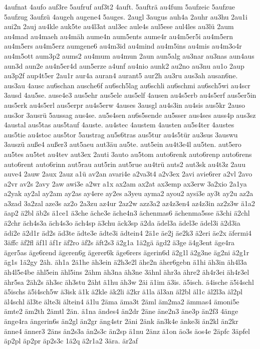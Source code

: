 {4aufnat
4aufo
auf3re
5aufruf
auf3t2
4auft.
5aufträ
au4fum
5aufzeic
5aufzue
5aufzug
3aufzü
4augeh
augene4
5auges.
2augl
3augus
auh4a
2auhr
au3hu
2au1i
aui2n
2auj
au4kle
auk5te
au4l3at
aul3ec
aule4s
aul5ese
aul4les
au3lü
2aum
au4mad
au4maeh
au4mäh
aume4n
aum5ents
aume4r
au4m5er5i
au4m5ern
au4m5ers
au4m5erz
aumgene6
au4m3id
au4mind
au4m5ins
au4mis
au4m3o4r
au4m5ott
aum3p2
aums2
au4mum
au4mun
2aun
aun5alg
au3nar
au3nas
aun4aus
aun3d
aun2e
au4n5er4d
aun5erze
a4unf
au4nio
aunk2
au2no
au3nu
au1o
2aup
au3p2f
aup4t5er
2au1r
aur4a
auran4
aurant5
aur2h
au3ru
aus3ah
ausan6ne.
aus3au
4ausc
au6schan
ausche6f
au6sch5lag
au6schli
au6schmi
au6sch5wi
au4scr
3ausd
4au5se.
ause4e3
aus5ehr
aus5ele
aus5elf
4ausen
au4s5erb
au4s5erf
aus5er5in
aus5erk
au4s5erl
aus5erpr
au4s5erw
4auses
3ausgl
au4s3in
au4sis
aus5kr
2auso
aus3or
3ausrü
5aussag
aus4se.
au5s4sen
au6s5sende
au5sser
aus4ses
auss4p
aus3sz
4austal
aus5tas
aus5tauf
4auste.
au4stec
4austem
4austen
au5s4ter
4austes
aus5tie
au4stoc
aus5tor
5austrag
au5s6tras
aus5tur
au4s5tür
au3sus
3auswu
3auszü
auße4
außer3
aut5aeu
aut3äu
au5te.
aut5ein
au4t3e4l
au5ten.
aut5ero
au5tes
au5tet
au4tev
aut3ex
2auti
3auto
au5tom
auto6renk
auto6renp
auto6rens
auto6rent
auto6rinn
aut5rau
aut5rin
aut5rue
au4trü
auts2
aut3sk
au4t3z
2auu
auve4
2auw
2aux
2auz
a1ü
av2an
avari4e
a2va3t4
a2v3ex
2avi
avie6rer
a2vl
2avo
a2vr
av2s
2avy
2aw
awi3e
a2wr
a1x
ax2am
ax2at
ax3emp
ax3erw
3a2xio
2a1ya
a2yak
ay2al
ay2am
ay2as
ay4ere
ay2es
a3yeu
ayma2
ayou2
aysi3e
ay3t
ay2u
az2a
a3zad
3a2zal
aze3s
az2o
2a3zu
az4ur
2az2w
azz3a2
az4z3en4
az4z3in
az2z3w
ä1a2
äap2
ä2bl
äb2s
ä1ce1
ä3che
äche3e
äche4n3
ächenmas6
ächenma5sse
ä3chi
ä2chl
ä2chr
äch4s3a
äch4s3o
äch4sp
ä3chu
äck3sp
ä2da
ädel3a
ädel3e
ädel3i
ä2d3ia
ädi2e
ä2d1r
äd2s
äd3te
ädte3e
ädte3i
ädtein4
2ä1e
äe2j
äe2k3
ä2eri
äe2x
äfermi4
3äffc
äf2fl
äf1l
äf1r
äf2ro
äf2s
äft2s3
ä2g1a
1ä2gä
ägd2
ä3ge
ä4g3ent
äge4ra
äger5as
äge6rend
ägeren6g
ägerer6k
äge6rers
ägerin6d
ä2g1l
ä2g3ne
äg2ni
ä2g1r
äg1s
1ä2gy
2äh.
äh1a
2ä1he
äh3ein
ä2h3e2l
ähe2n
äher6gebn
ä1hi
äh3in
äh4l3a
äh4l5e4be
ähl5ein
ähl5ins
2ähm
äh3na
äh3ne
3ähnl
ähr3a
ähre2
äh4r3ei
äh4r3el
ähr5sa
2äh2s
äh3sc
äh3stu
2äht
ä1hu
äh3w
2äi
ä1im
ä3is.
ä5isch.
ä4ische
ä5i4schl
ä5ischs
ä5i4sch5w
ä3isk
ä1k
ä2kle
äk2li
ä2kr
ä1la
äl3an
äl2bl
äl1c
äl2l3a
äl2pl
äl4schl
äl3te
älte3i
ältein4
ä1lu
2äma
äma3t
2äml
äm2ma2
ämmas4
ämoni5e
ämte2
äm2th
2ämtl
2än.
ä1na
ändes4
än2dr
2äne
äne2n3
äne3p
än2f3
4änge
änge4ra
ängerin6s
än2gl
än2gr
äng4str
2äni
2änk
än3k4e
änke3i
än2kl
än2kr
änne4
änner3
2äns
än2s3a
än2s3c
än2sp
ä1nu
2änz
ä1on
äo3s
äos4e
2äpfc
3äpfel
äp2pl
äp2pr
äp2s3c
1ä2q
ä2r1a2
3ära.
är2af
}
